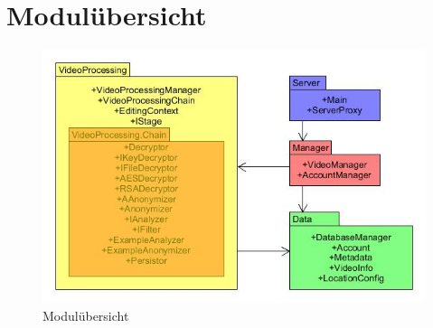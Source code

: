 \section{Modulübersicht} \label{service:modul}

\begin{figure}[ht]
	\centering
\includegraphics[width=1\textwidth]{./resources/Diagramme/Webservice/modules_overview.jpg}
\caption{Modulübersicht}
	\label{fig:modules_overview}
\end{figure}




